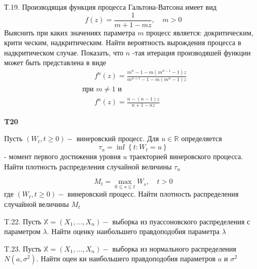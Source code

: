 \documentclass[a4paper,12pt]{article} %
\begin{document}
\begin{example}

Т.19. Производящая функция процесса Гальтона-Ватсона имеет вид
$$
f(z)=\frac{1}{m+1-m z}, \quad m>0
$$
Выяснить при каких значениях параметра $m$ процесс является: докритическим, крити ческим, надкритическим. 
Найти вероятность вырождения процесса в надкритическом случае. 
Показать, что $n$ -тая итерация производяшей функции может быть представлена в виде
\begin{equation}
\begin{array}{l}
\qquad f^{n}(z)=\frac{m^{n}-1-m\left(m^{n-1}-1\right) z}{m^{n+1}-1-m\left(m^{n}-1\right) z} \\
\text { при } m \neq 1 \text { и } \\
\qquad f^{n}(z)=\frac{n-(n-1) z}{n+1-n z}
\end{array}
\end{equation}


\end{example}





\begin{example}\textbf{T20}

Пусть $\left(W_{t}, t \geq 0\right)-$ винеровский процесс. Для $u \in \mathbb{R}$ определяется
$$
\tau_{u}=\inf \left\{t: W_{t}=u\right\}
$$
- момент первого достижения уровня $u$ траекторией винеровского процесса. 
Найти плотность распределения случайной величины $\tau_{u}$




\end{example}






\begin{example}

$$
M_{t}=\max _{0 \leq s \leq t} W_{s}, \quad t>0
$$
где $\left(W_{t}, t \geq 0\right)-$ винеровский процесс. Найти плотность распределения случайной величины $M_{t}$




\end{example}



\begin{example}

T.22. Пусть $\mathbb{X}=\left(X_{1}, \ldots, X_{n}\right)-$ выборка из пуассоновского распределения
с параметром $\lambda .$ Найти оценку наибольшего правдоподобия параметра
$\lambda$




\end{example}



\begin{example}

T.23. Пусть $\mathbb{X}=\left(X_{1}, \ldots, X_{n}\right)-$ выборка из нормального распределения $N\left(a, \sigma^{2}\right) .$ Найти оцен ки наибольшего правдоподобия параметров $a$ и $\sigma^{2}$




\end{example}
\end{document}
